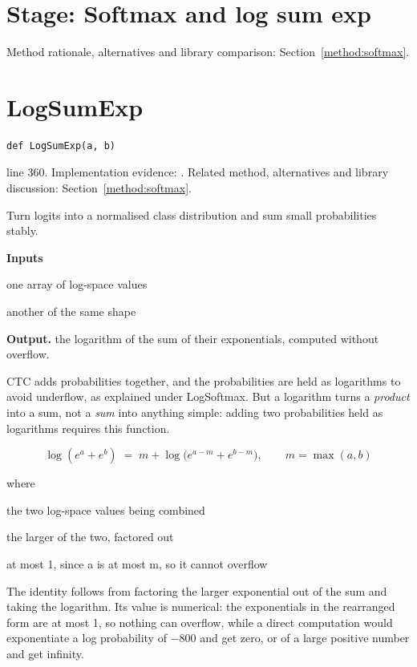 \section*{Stage: Softmax and log sum exp}
Method rationale, alternatives and library comparison: Section~\ref{method:softmax}.
\section{LogSumExp}\label{fn:train:LogSumExp}
\begin{lstlisting}[style=sig]
def LogSumExp(a, b)
\end{lstlisting}
 line 360. Implementation evidence: \cite{code2026}. Related method, alternatives and library discussion: Section~\ref{method:softmax}.


Turn logits into a normalised class distribution and sum small probabilities stably.




\noindent\textbf{Inputs}
\begin{description}[leftmargin=2.2em,style=nextline,font=\normalfont\ttfamily]\setlength\itemsep{1pt}
  \item[{a}] \normalfont one array of log-space values
  \item[{b}] \normalfont another of the same shape
\end{description}

\noindent\textbf{Output.} the logarithm of the sum of their exponentials, computed without overflow.


CTC adds probabilities together, and the probabilities are held as logarithms to avoid underflow, as explained under LogSoftmax. But a logarithm turns a \emph{product} into a sum, not a \emph{sum} into anything simple: adding two probabilities held as logarithms requires this function.


\begin{equation}
\log(e^a + e^b) \;=\; m + \log\!\big(e^{a-m} + e^{b-m}\big), \qquad m = \max(a,b)
\end{equation}

\noindent where
\begin{description}[leftmargin=2.4em,style=nextline,font=\normalfont\ttfamily]\setlength\itemsep{1pt}
  \item[{$a,\,b$}] \normalfont the two log-space values being combined
  \item[{$m$}] \normalfont the larger of the two, factored out
  \item[{$e^{a-m}$}] \normalfont at most 1, since a is at most m, so it cannot overflow
\end{description}
The identity follows from factoring the larger exponential out of the sum and taking the logarithm. Its value is numerical: the exponentials in the rearranged form are at most 1, so nothing can overflow, while a direct computation would exponentiate a log probability of $-$800 and get zero, or of a large positive number and get infinity.


